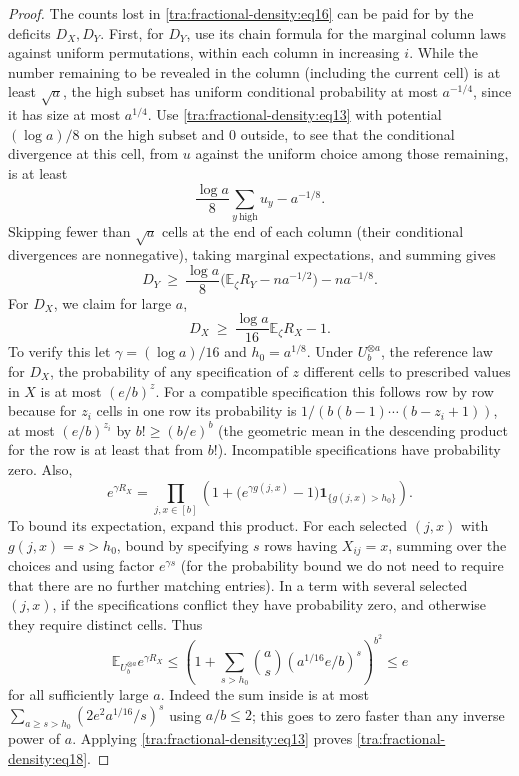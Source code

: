 \begin{proof}
\label{tra:fractional-density:high-atom-and-clump-charge}
The counts lost in \eqref{tra:fractional-density:eq16} can be paid for by the deficits \(D_X,D_Y\). First, for \(D_Y\), use its chain formula for the marginal column laws against uniform permutations, within each column in increasing \(i\). While the number remaining to be revealed in the column (including the current cell) is at least \(\sqrt a\), the high subset has uniform conditional probability at most \(a^{-1/4}\), since it has size at most \(a^{1/4}\). Use \eqref{tra:fractional-density:eq13} with potential \((\log a)/8\) on the high subset and 0 outside, to see that the conditional divergence at this cell, from \(u\) against the uniform choice among those remaining, is at least
\[
 \frac{\log a}{8}\sum_{y\ \mathrm{high}} u_y - a^{-1/8}.
\]
Skipping fewer than \(\sqrt a\) cells at the end of each column (their conditional divergences are nonnegative), taking marginal expectations, and summing gives
\begin{equation}
 D_Y\ \ge\ \frac{\log a}{8}\big(\mathbb E_\zeta R_Y - n a^{-1/2}\big)-n a^{-1/8}.
 \label{tra:fractional-density:eq17}
\end{equation}
For \(D_X\), we claim for large \(a\),
\begin{equation}
 D_X\ \ge\ \frac{\log a}{16}\mathbb E_\zeta R_X-1.
 \label{tra:fractional-density:eq18}
\end{equation}
To verify this let \(\gamma=(\log a)/16\) and \(h_0=a^{1/8}\). Under \(U_b^{\otimes a}\), the reference law for \(D_X\), the probability of any specification of \(z\) different cells to prescribed values in \(X\) is at most \((e/b)^z\). For a compatible specification this follows row by row because for \(z_i\) cells in one row its probability is \(1/(b(b-1)\cdots(b-z_i+1))\), at most \((e/b)^{z_i}\) by \(b!\ge (b/e)^b\) (the geometric mean in the descending product for the row is at least that from \(b!\)). Incompatible specifications have probability zero. Also,
\[
 e^{\gamma R_X}
  =\prod_{j,x\in[b]}
       \left(1+\big(e^{\gamma g(j,x)}-1\big)\mathbf 1_{\{g(j,x)>h_0\}}\right).
\]
To bound its expectation, expand this product. For each selected \((j,x)\) with \(g(j,x)=s>h_0\), bound by specifying \(s\) rows having \(X_{ij}=x\), summing over the choices and using factor \(e^{\gamma s}\) (for the probability bound we do not need to require that there are no further matching entries). In a term with several selected \((j,x)\), if the specifications conflict they have probability zero, and otherwise they require distinct cells. Thus
\[
 \mathbb E_{U_b^{\otimes a}} e^{\gamma R_X}
 \le \left(1+\sum_{s>h_0}\binom{a}{s} (a^{1/16} e/b)^s\right)^{b^2}
 \le e
\]
for all sufficiently large \(a\). Indeed the sum inside is at most \(\sum_{a\ge s>h_0} (2 e^2 a^{1/16}/s)^s\) using \(a/b\le 2\); this goes to zero faster than any inverse power of \(a\). Applying \eqref{tra:fractional-density:eq13} proves \eqref{tra:fractional-density:eq18}.


\end{proof}
